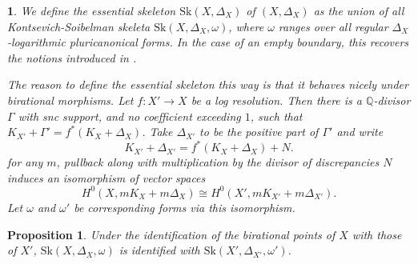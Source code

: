 \documentclass{amsart}%
\numberwithin{equation}{subsection}
\theoremstyle{plain2}
\newtheorem{prop}[equation]{Proposition}
\theoremstyle{definition2}
\theoremstyle{stepstyle}
\theoremstyle{point}
\theoremstyle{subpoint}
\newtheorem{subpoint}[equation]{}%
\newcommand{\spa}[1]{\begin{subpoint}#1\end{subpoint}}           %
\newcommand{\Sk}{\mathrm{Sk}}
\begin{document}
\spa{We define the essential skeleton $\Sk(X,\Delta_X)$ of $(X,\Delta_X)$ as the union of all Kontsevich-Soibelman skeleta $\Sk(X, \Delta_X,\omega)$, where $\omega$ ranges over all regular $\Delta_X$-logarithmic pluricanonical forms. In the case of an empty boundary, this recovers the notions introduced in \cite{MustataNicaise}.

The reason to define the essential skeleton this way is that it behaves nicely under birational morphisms. Let $f \colon X'\to X$ be a log resolution. Then there is a $\mathbb{Q}$-divisor $\Gamma$ with snc support, and no coefficient exceeding $1$, such that $K_{X'}+\Gamma' = f^*(K_X+\Delta_X)$. Take $\Delta_{X'}$ to be the positive part of $\Gamma'$ and write $$K_{X'}+\Delta_{X'}= f^*(K_{X}+\Delta_X)+N.$$ for any $m$, pullback along with multiplication by the divisor of discrepancies $N$ induces an isomorphism of vector spaces \begin{equation} \label{equ isomo forms log resolution}
H^0(X, mK_{X}+m\Delta_X) \cong H^0(X', mK_{X'}+m\Delta_{X'}).
\end{equation} Let $\omega$ and $\omega'$ be corresponding forms via this isomorphism.}
\begin{prop} \label{prop birational invariance essential skeleton for pairs}
Under the identification of the birational points of $X$ with those of $X'$, $\Sk(X, \Delta_X,\omega)$ is identified with $\Sk(X', \Delta_{X'},\omega')$.
\end{prop}
\end{document}
